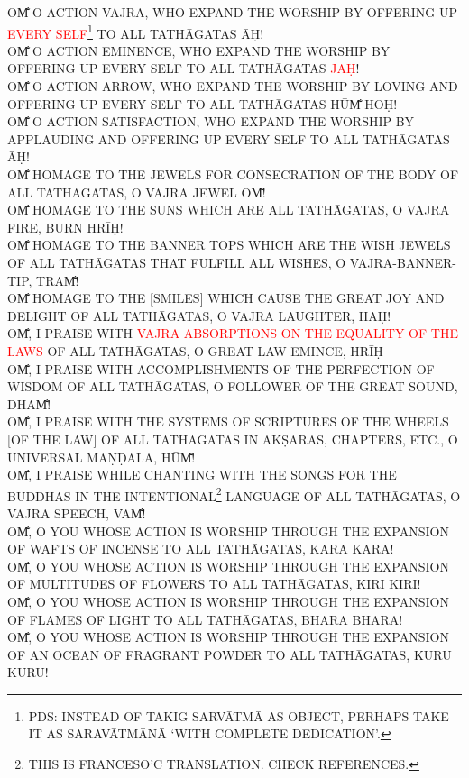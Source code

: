 \documentclass[11pt]{book}
\makeatletter
\def\fakesc#1{%
  \begingroup%
  \xdef\fake@name{\csname\curr@fontshape/\f@size\endcsname}%
  \fontsize{1.3\fontdimen8\fake@name}{\baselineskip}\selectfont%
  \uppercase{#1}%
  \endgroup%
}
\newcommand{\mantra}[1]{\fakesc{#1}}
\newcommand{\red}[1]{\textcolor{red}{#1}}
\makeatother
\begin{document}
\mantra{om̐ o action vajra, who expand the worship by offering up \red{every self}\footnote{PDS: instead of takig sarvātmā as object, perhaps take it as saravātmānā `with complete dedication'.} to All Tathāgatas āḥ!}\\
\mantra{om̐ o action eminence, who expand the worship by offering up every self to All Tathāgatas \red{jaḥ}!}\\
\mantra{om̐ o action arrow, who expand the worship by loving and offering up every self to All Tathāgatas hūm̐ hoḥ!}\\
\mantra{om̐ o action satisfaction, who expand the worship by applauding and offering up every self to All Tathāgatas āḥ!}\\
\mantra{om̐ homage to the jewels for consecration of the body of All Tathāgatas, o vajra jewel om̐!}\\
\mantra{om̐ homage to the suns which are All Tathāgatas, o vajra fire, burn hrīḥ!}\\
\mantra{om̐ homage to the banner tops which are the wish jewels of All Tathāgatas that fulfill all wishes, o vajra-banner-tip, tram̐!}\\
\mantra{om̐ homage to the [smiles] which cause the great joy and delight of All Tathāgatas, o vajra laughter, haḥ!}\\
\mantra{om̐, I praise with \red{vajra absorptions on the equality of the Laws} %
 of All Tathāgatas, o great Law emince, hrīḥ}\\
\mantra{om̐, I praise with accomplishments of the perfection of wisdom of All Tathāgatas, o follower of the great sound, dham̐!}\\
\mantra{om̐, I praise with the systems of scriptures of the wheels [of the Law] of All Tathāgatas in akṣaras, chapters, etc., o universal maṇḍala, hūm̐!}\\
\mantra{om̐, I praise while chanting with the songs for the Buddhas in the intentional\footnote{This is Franceso'c translation. Check references.} language of All Tathāgatas, o vajra speech, vam̐!}\\
\mantra{om̐, o you whose action is worship through the expansion of wafts of incense to All Tathāgatas, kara kara!}\\
\mantra{om̐, o you whose action is worship through the expansion of multitudes of flowers to All Tathāgatas, kiri kiri!}\\
\mantra{om̐, o you whose action is worship through the expansion of flames of light to All Tathāgatas, bhara bhara!}\\
\mantra{om̐, o you whose action is worship through the expansion of an ocean of fragrant powder to All Tathāgatas, kuru kuru!}\\
\end{document}
